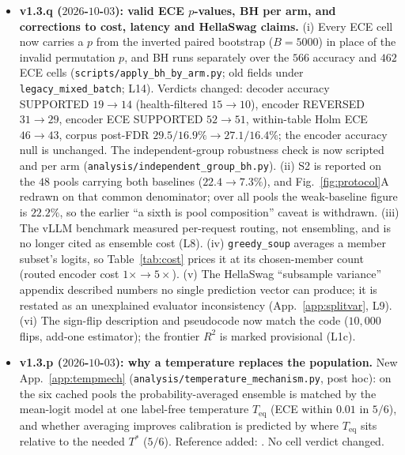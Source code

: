 \documentclass[11pt]{article}
\begin{document}
\begin{itemize}[leftmargin=*]
\item \textbf{v1.3.q ($2026$-$10$-$03$): valid ECE $p$-values, BH per arm, and corrections to cost, latency and HellaSwag claims.} (i) Every ECE cell now carries a $p$ from the inverted paired bootstrap ($B{=}5000$) in place of the invalid permutation $p$, and BH runs separately over the $566$ accuracy and $462$ ECE cells (\texttt{scripts/\allowbreak apply\_\allowbreak bh\_\allowbreak by\_\allowbreak arm.\allowbreak py}; old fields under \texttt{legacy\_\allowbreak mixed\_\allowbreak batch}; L14). Verdicts changed: decoder accuracy SUPPORTED $19\to14$ (health-filtered $15\to10$), encoder REVERSED $31\to29$, encoder ECE SUPPORTED $52\to51$, within-table Holm ECE $46\to43$, corpus post-FDR $29.5/16.9\%\to27.1/16.4\%$; the encoder accuracy null is unchanged. The independent-group robustness check is now scripted and per arm (\texttt{analysis/\allowbreak independent\_\allowbreak group\_\allowbreak bh.\allowbreak py}). (ii) S2 is reported on the $48$ pools carrying both baselines ($22.4\to7.3\%$), and Fig.~\ref{fig:protocol}A redrawn on that common denominator; over all pools the weak-baseline figure is $22.2\%$, so the earlier ``a sixth is pool composition'' caveat is withdrawn. (iii) The vLLM benchmark measured per-request routing, not ensembling, and is no longer cited as ensemble cost (L8). (iv) \texttt{greedy\_soup} averages a member subset's logits, so Table~\ref{tab:cost} prices it at its chosen-member count (routed encoder cost $1\times\to5\times$). (v) The HellaSwag ``subsample variance'' appendix described numbers no single prediction vector can produce; it is restated as an unexplained evaluator inconsistency (App.~\ref{app:splitvar}, L9). (vi) The sign-flip description and pseudocode now match the code ($10{,}000$ flips, add-one estimator); the frontier $R^2$ is marked provisional (L1c).
\item \textbf{v1.3.p ($2026$-$10$-$03$): why a temperature replaces the population.} New App.~\ref{app:tempmech} (\texttt{analysis/\allowbreak temperature\_\allowbreak mechanism.\allowbreak py}, post hoc): on the six cached pools the probability-averaged ensemble is matched by the mean-logit model at one label-free temperature $T_{\mathrm{eq}}$ (ECE within $0.01$ in $5/6$), and whether averaging improves calibration is predicted by where $T_{\mathrm{eq}}$ sits relative to the needed $T^*$ ($5/6$). Reference added: \citet{mackay1992evidence}. No cell verdict changed.

\end{itemize}
\end{document}
